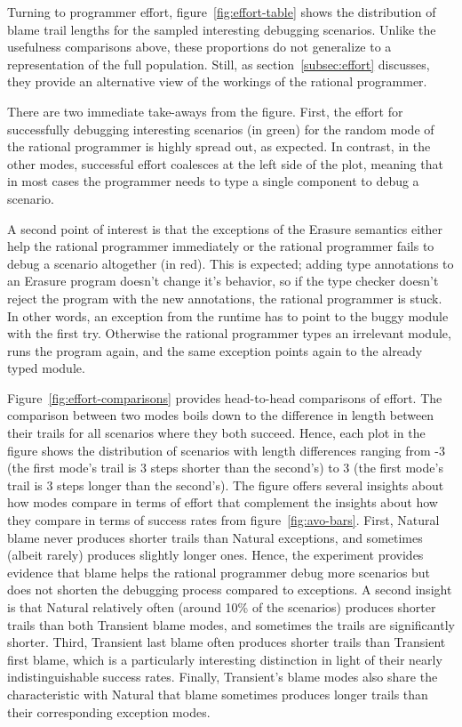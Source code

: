 Turning to programmer effort, figure~\ref{fig:effort-table} shows the
distribution of blame trail lengths for the sampled interesting debugging
scenarios. Unlike the usefulness comparisons above, these proportions do
not generalize to a representation of the full population.  Still, as
section~\ref{subsec:effort} discusses, they provide an alternative view of
the workings of the rational programmer. 

There are two immediate take-aways from the figure. First, the effort for
successfully debugging interesting scenarios (in green) for the random
mode of the rational programmer is highly spread out, as
expected. In contrast, in the other modes, successful effort coalesces at
the left side of the plot, meaning that in most cases the programmer needs
to type a single component to debug a scenario. 

A second point of interest is that the exceptions of the Erasure semantics
either help the rational programmer immediately or the rational programmer
fails to debug a scenario altogether (in red).  This is expected; adding
type annotations to an Erasure program doesn't change it's behavior, so if
the type checker doesn't reject the program with the new annotations, the
rational programmer is stuck.  In other words, an exception from the
runtime has to point to the buggy module with the first try. Otherwise the
rational programmer types an irrelevant module, runs the program again,
and the same exception points again to the already typed module. 

Figure~\ref{fig:effort-comparisons} provides head-to-head comparisons of
effort.  The comparison between two modes boils down to the difference in
length between their trails for all scenarios where they both succeed.
Hence, each plot in the figure shows the distribution of scenarios with
length differences ranging from -3 (the first mode's trail is 3 steps
shorter than the second's) to 3 (the first mode's trail is 3 steps longer
than the second's).  The figure offers several insights about how  modes
compare in terms of effort that complement the insights about how they
compare in terms of success rates from figure~\ref{fig:avo-bars}.  First,
Natural blame never produces shorter trails than Natural exceptions, and
sometimes (albeit rarely) produces slightly longer ones.  Hence, the
experiment provides evidence that blame helps the rational programmer
debug more scenarios but does not shorten the debugging process compared
to exceptions. A second insight is that Natural relatively often (around 10\% of the
scenarios) produces shorter trails than both Transient blame modes, and
sometimes the trails are significantly shorter.  Third, Transient last
blame often produces shorter trails than Transient first blame, which is a
particularly interesting distinction in light of their nearly
indistinguishable success rates.  Finally, Transient's blame modes also
share the characteristic with Natural that blame sometimes produces longer
trails than their corresponding exception modes.

